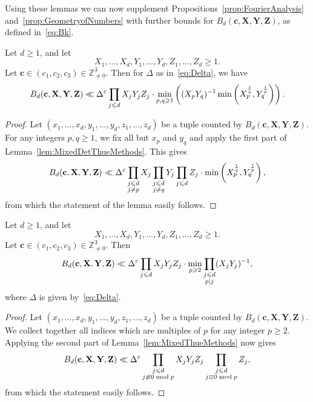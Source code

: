 Using these lemmas we can now supplement Propositions~\ref{prop:FourierAnalysis}
and~\ref{prop:GeometryofNumbers} with further bounds
for $B_d(\mathbf{c},\mathbf{X},\mathbf{Y},\mathbf{Z})$, as defined in~\eqref{eq:Bk}.


\begin{proposition}\label{prop:DeterminantMethod}
  Let $d\geq 1$, and let
  \[
  X_1,\ldots, X_d, Y_1,\ldots, Y_d,Z_1,\ldots, Z_d\geq 1.
  \]
  Let $\mathbf{c}\in (c_1,c_2,c_3)\in \mathbb{Z}_{\neq 0}^3$.
  Then for $\Delta$ as in~\eqref{eq:Delta}, we have
  \[
  B_d(\mathbf{c},\mathbf{X},\mathbf{Y},\mathbf{Z}) \ll
  \Delta^\varepsilon \prod_{j\leqslant d} X_j Y_j Z_j \cdot
  \min_{p,q\geqslant 1}\left(
  (X_p Y_q)^{-1}
  \min\left( X_p^{\frac{1}{q}} , Y_q^{\frac{1}{p}}\right)\right).
  \]
\end{proposition}


\begin{proof}
  Let $(x_1,\ldots, x_d,y_1,\ldots, y_d,z_1,\ldots, z_d)$ be a tuple counted by $B_d(\mathbf{c},\mathbf{X},\mathbf{Y},\mathbf{Z})$.
  For any integers $p,q\geq 1$, we fix all but $x_p$ and $y_q$ and apply
  the first part of Lemma~\ref{lem:MixedDetThueMethods}. This gives
  \[
  B_d(\mathbf{c},\mathbf{X},\mathbf{Y},\mathbf{Z}) \ll
  \Delta^\varepsilon \prod_{\substack{j\leqslant d\\ j\neq p }} X_j
  \prod_{\substack{j\leqslant d\\ j\neq q }} Y_j
  \prod_{\substack{j\leqslant d }} Z_j \cdot
  \min\left( X_p^{\frac{1}{q}} , Y_q^{\frac{1}{p}}\right) ,
  \]
  from which the statement of the lemma easily follows.
\end{proof}

\begin{proposition} \label{prop:ThueEquations}
  Let $d\geq 1$, and let
  \[
  X_1,\ldots, X_d, Y_1,\ldots, Y_d,Z_1,\ldots, Z_d\geq 1.
  \]
  Let $\mathbf{c}\in (c_1,c_2,c_3)\in \mathbb{Z}_{\neq 0}^3$.
  Then
  \[
  B_d(\mathbf{c},\mathbf{X},\mathbf{Y},\mathbf{Z}) \ll
  \Delta^\varepsilon \prod_{j\leqslant d} X_j Y_j Z_j \cdot
  \min_{p\geqslant 2}
  \prod_{\substack{j\leqslant d \\ p\mid j}} (X_j Y_j)^{-1},
  \]
  where $\Delta$ is given by~\eqref{eq:Delta}.
\end{proposition}
\begin{proof}
  Let $(x_1,\ldots, x_d,y_1,\ldots, y_d,z_1,\ldots, z_d)$ be a tuple counted by $B_d(\mathbf{c},\mathbf{X},\mathbf{Y},\mathbf{Z})$.
  We collect together all indices which are multiples of $p$ for any integer $p\geq 2$.
  Applying the second part of Lemma~\ref{lem:MixedThueMethods} now gives
  \[
  B_d(\mathbf{c},\mathbf{X},\mathbf{Y},\mathbf{Z}) \ll
  \Delta^\varepsilon \prod_{\substack{j\leqslant d\\ j\not\equiv 0 \bmod{p} }} X_j Y_j Z_j
  \prod_{\substack{j\leqslant d\\ j\equiv 0 \bmod{p} }} Z_j,
  \]
  from which the statement easily follows.
\end{proof}

